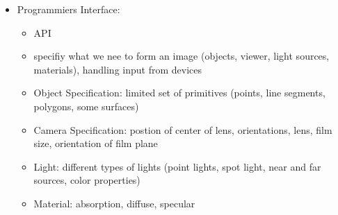 \documentclass[11pt,a4paper]{article}
\begin{document}
\begin{itemize}
			\item Programmiers Interface:
			\begin{itemize}
				\item API
				\item specifiy what we nee to form an image (objects, viewer, light sources, materials), handling input from devices
				\item Object Specification: limited set of primitives (points, line segments, polygons, some surfaces)
				\item Camera Specification: postion of center of lens, orientations, lens, film size, orientation of film plane
				\item Light: different types of lights (point lights, spot light, near and far sources, color properties)
				\item Material: absorption, diffuse, specular
			\end{itemize}
		\end{itemize}
\end{document}
